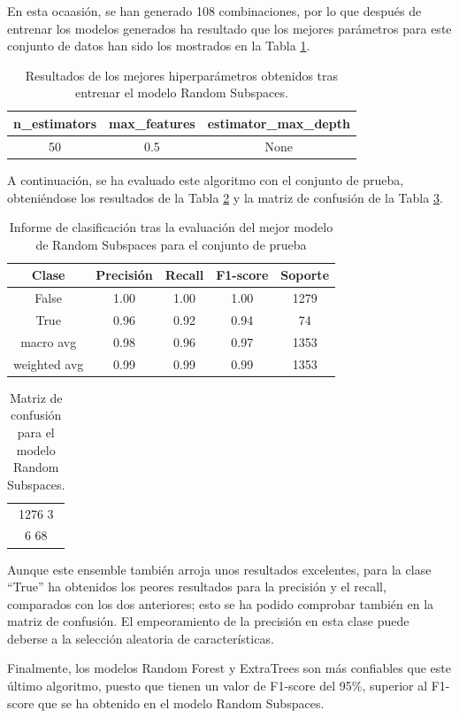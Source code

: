 \documentclass[12pt,letterpaper]{article}
\begin{document}
En esta ocaasión, se han generado 108 combinaciones, por lo que después de entrenar los modelos generados ha resultado que los mejores parámetros para este conjunto de datos han sido los mostrados en la Tabla \ref{tab:hiper-RS}.
\begin{table}[H]
    \centering
    \begin{tabular}{|c|c|c|}
    \hline
    n\_estimators & max\_features & estimator\_max\_depth \\ \hline
    50 & 0.5 & None \\ \hline
    \end{tabular}
    \caption{Resultados de los mejores hiperparámetros obtenidos tras entrenar el modelo Random Subspaces.}
    \label{tab:hiper-RS}
\end{table}

A continuación, se ha evaluado este algoritmo con el conjunto de prueba, obteniéndose los resultados de la Tabla \ref{tab:res-RS} y la matriz de confusión de la Tabla \ref{tab:confusion-RS}. 
\begin{table}[H]
    \centering
    \begin{tabular}{|c|c|c|c|c|}
    \hline
    Clase & Precisión & Recall & F1-score & Soporte \\ \hline\hline
    False & 1.00& 1.00 &  1.00 & 1279 \\ \hline
    True & 0.96 & 0.92 & 0.94 &  74 \\ \hline 
    macro avg &  0.98 & 0.96 & 0.97 & 1353 \\ \hline
    weighted avg & 0.99 &  0.99 & 0.99 & 1353 \\ \hline
    \end{tabular}
    \caption{Informe de clasificación tras la evaluación del mejor modelo de Random Subspaces para el conjunto de prueba}
    \label{tab:res-RS}
\end{table}

\begin{table}[H]
    \centering
    \begin{tabular}{|c|}
    \hline
    1276 \hspace{8mm} 3 \\
    6 \hspace{12mm} 68 \\ \hline 
    \end{tabular}
    \caption{Matriz de confusión para el modelo Random Subspaces.}
    \label{tab:confusion-RS}
\end{table}

Aunque este ensemble también arroja unos resultados excelentes, para la clase ``True'' ha obtenidos los peores resultados para la precisión y el recall, comparados con los dos anteriores; esto se ha podido comprobar también en la matriz de confusión. El empeoramiento de la precisión en esta clase puede deberse a la selección aleatoria de características.

Finalmente, los modelos Random Forest y ExtraTrees son más confiables que este último algoritmo, puesto que tienen un valor de F1-score del 95\%, superior al F1-score que se ha obtenido en el modelo Random Subspaces.



\printbibliography
\end{document}
